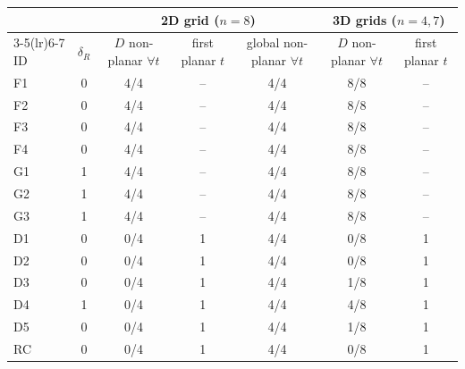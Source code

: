 \begin{tabular}{lcccccc}
\toprule
 & & \multicolumn{3}{c}{2D grid ($n=8$)} & \multicolumn{2}{c}{3D grids ($n=4,7$)}\\
\cmidrule(lr){3-5}\cmidrule(lr){6-7}
ID & $\delta_R$ & $D$ non-planar $\forall t$ & first planar $t$ & global non-planar $\forall t$ & $D$ non-planar $\forall t$ & first planar $t$\\
\midrule
F1 & 0 & 4/4 & -- & 4/4 & 8/8 & --\\
F2 & 0 & 4/4 & -- & 4/4 & 8/8 & --\\
F3 & 0 & 4/4 & -- & 4/4 & 8/8 & --\\
F4 & 0 & 4/4 & -- & 4/4 & 8/8 & --\\
G1 & 1 & 4/4 & -- & 4/4 & 8/8 & --\\
G2 & 1 & 4/4 & -- & 4/4 & 8/8 & --\\
G3 & 1 & 4/4 & -- & 4/4 & 8/8 & --\\
D1 & 0 & 0/4 & 1 & 4/4 & 0/8 & 1\\
D2 & 0 & 0/4 & 1 & 4/4 & 0/8 & 1\\
D3 & 0 & 0/4 & 1 & 4/4 & 1/8 & 1\\
D4 & 1 & 0/4 & 1 & 4/4 & 4/8 & 1\\
D5 & 0 & 0/4 & 1 & 4/4 & 1/8 & 1\\
RC & 0 & 0/4 & 1 & 4/4 & 0/8 & 1\\
\bottomrule
\end{tabular}

